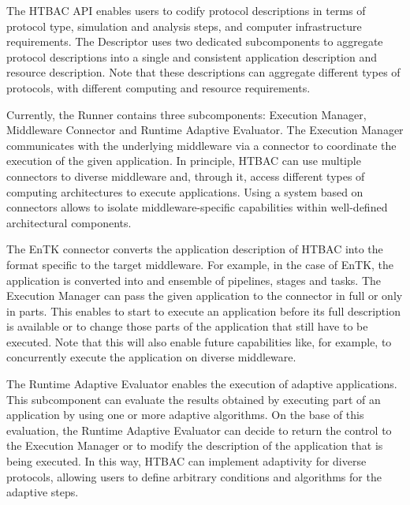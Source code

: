 The HTBAC API enables users to codify protocol descriptions in terms of
protocol type, simulation and analysis steps, and computer infrastructure
requirements. The Descriptor uses two dedicated subcomponents to aggregate
protocol descriptions into a single and consistent application description
and resource description. Note that these descriptions can aggregate
different types of protocols, with different computing and resource
requirements.

Currently, the Runner contains three subcomponents: Execution Manager,
Middleware Connector and Runtime Adaptive Evaluator. The Execution Manager
communicates with the underlying middleware via a connector to coordinate the
execution of the given application. In principle, HTBAC can use multiple
connectors to diverse middleware and, through it, access different types of
computing architectures to execute applications. Using a system based on
connectors allows to isolate middleware-specific capabilities within
well-defined architectural components.

The EnTK connector converts the application description of HTBAC into the
format specific to the target middleware. For example, in the case of EnTK,
the application is converted into and ensemble of pipelines, stages and
tasks. The Execution Manager can pass the given application to the connector
in full or only in parts. This enables to start to execute an application
before its full description is available or to change those parts of the
application that still have to be executed. Note that this will also enable
future capabilities like, for example, to concurrently execute the
application on diverse middleware.

The Runtime Adaptive Evaluator enables the execution of adaptive
applications. This subcomponent can evaluate the results obtained by
executing part of an application by using one or more adaptive algorithms. On
the base of this evaluation, the Runtime Adaptive Evaluator can decide to
return the control to the Execution Manager or to modify the description of
the application that is being executed. In this way, HTBAC can implement
adaptivity for diverse protocols, allowing users to define arbitrary
conditions and algorithms for the adaptive steps.


